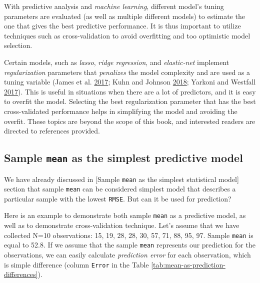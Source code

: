 \documentclass[
]{book}
\begin{document}
With predictive analysis and \emph{machine learning}, different model's tuning parameters are evaluated (as well as multiple different models) to estimate the one that gives the best predictive performance. It is thus important to utilize techniques such as cross-validation to avoid overfitting and too optimistic model selection.

Certain models, such as \emph{lasso}, \emph{ridge regression}, and \emph{elastic-net} implement \emph{regularization} parameters that \emph{penalizes} the model complexity and are used as a tuning variable (James et al. \protect\hyperlink{ref-jamesIntroductionStatisticalLearning2017}{2017}; Kuhn and Johnson \protect\hyperlink{ref-kuhnAppliedPredictiveModeling2018}{2018}; Yarkoni and Westfall \protect\hyperlink{ref-yarkoniChoosingPredictionExplanation2017}{2017}). This is useful in situations when there are a lot of predictors, and it is easy to overfit the model. Selecting the best regularization parameter that has the best cross-validated performance helps in simplifying the model and avoiding the overfit. These topics are beyond the scope of this book, and interested readers are directed to references provided.

\hypertarget{sample-mean-as-the-simplest-predictive-model}{%
\subsection{\texorpdfstring{Sample \texttt{mean} as the simplest predictive model}{Sample mean as the simplest predictive model}}\label{sample-mean-as-the-simplest-predictive-model}}

We have already discussed in {[}Sample \texttt{mean} as the simplest statistical model{]} section that sample \texttt{mean} can be considered simplest model that describes a particular sample with the lowest \texttt{RMSE}. But can it be used for prediction?

Here is an example to demonstrate both sample \texttt{mean} as a predictive model, as well as to demonstrate cross-validation technique. Let's assume that we have collected N=10 observations: 15, 19, 28, 28, 30, 57, 71, 88, 95, 97. Sample \texttt{mean} is equal to 52.8. If we assume that the sample \texttt{mean} represents our prediction for the observations, we can easily calculate \emph{prediction error} for each observation, which is simple difference (column \texttt{Error} in the Table \ref{tab:mean-as-prediction-differences}).
\end{document}
